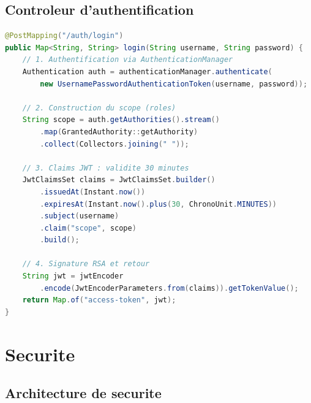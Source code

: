 \documentclass[12pt,a4paper]{report}
\begin{document}
\section{Controleur d'authentification}

\begin{lstlisting}[language=Java, caption={AuthController -- generation du JWT}]
@PostMapping("/auth/login")
public Map<String, String> login(String username, String password) {
    // 1. Authentification via AuthenticationManager
    Authentication auth = authenticationManager.authenticate(
        new UsernamePasswordAuthenticationToken(username, password));

    // 2. Construction du scope (roles)
    String scope = auth.getAuthorities().stream()
        .map(GrantedAuthority::getAuthority)
        .collect(Collectors.joining(" "));

    // 3. Claims JWT : validite 30 minutes
    JwtClaimsSet claims = JwtClaimsSet.builder()
        .issuedAt(Instant.now())
        .expiresAt(Instant.now().plus(30, ChronoUnit.MINUTES))
        .subject(username)
        .claim("scope", scope)
        .build();

    // 4. Signature RSA et retour
    String jwt = jwtEncoder
        .encode(JwtEncoderParameters.from(claims)).getTokenValue();
    return Map.of("access-token", jwt);
}
\end{lstlisting}

\chapter{Securite}

\section{Architecture de securite}

\begin{center}
\end{center}
\end{document}
